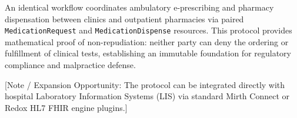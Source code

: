 An identical workflow coordinates ambulatory e-prescribing and pharmacy dispensation between clinics and outpatient pharmacies via paired \texttt{MedicationRequest} and \texttt{MedicationDispense} resources. This protocol provides mathematical proof of non-repudiation: neither party can deny the ordering or fulfillment of clinical tests, establishing an immutable foundation for regulatory compliance and malpractice defense.

[Note / Expansion Opportunity: The protocol can be integrated directly with hospital Laboratory Information Systems (LIS) via standard Mirth Connect or Redox HL7 FHIR engine plugins.]
